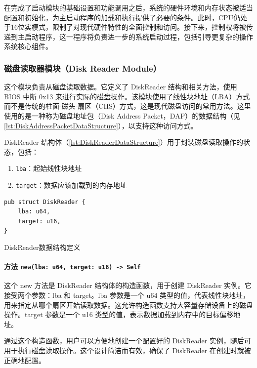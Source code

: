 在完成了启动模块的基础设置和功能调用之后，系统的硬件环境和内存状态被适当配置和初始化，为主启动程序的加载和执行提供了必要的条件。此时，CPU仍处于16位实模式，限制了对现代硬件特性的全面控制和访问。接下来，控制权将被传递到主启动程序，这一程序将负责进一步的系统启动过程，包括引导更复杂的操作系统核心组件。

\subsubsection{磁盘读取器模块（Disk Reader Module）}

这个模块负责从磁盘读取数据。它定义了 DiskReader 结构和相关方法，使用 BIOS 中断 0x13 来进行实际的磁盘操作。该模块使用了线性块地址（LBA）方式而不是传统的柱面-磁头-扇区（CHS）方式，这是现代磁盘访问的常用方法。这里使用的是一种称为磁盘地址包（Disk Address Packet，DAP）的数据结构（见\cref{lst:DiskAddressPacketDataStructure}），以支持这种访问方式。

DiskReader 结构体（\cref{lst:DiskReaderDataStructure}）用于封装磁盘读取操作的状态，包括：

\begin{enumerate}
    \item \texttt{lba}：起始线性块地址
    \item \texttt{target}：数据应该加载到的内存地址
\end{enumerate}

\begin{listing}[htbp]
    \begin{verbatim}
pub struct DiskReader {
    lba: u64,
    target: u16,
}
    \end{verbatim}
    \caption{DiskReader数据结构定义}\label{lst:DiskReaderDataStructure}
\end{listing}

\paragraph{方法 \texttt{new(lba: u64, target: u16) -> Self}}

这个 new 方法是 DiskReader 结构体的构造函数，用于创建 DiskReader 实例。它接受两个参数：lba 和 target。lba 参数是一个 u64 类型的值，代表线性块地址，用来指定从哪个扇区开始读取数据。这允许构造函数支持大容量存储设备上的磁盘操作。target 参数是一个 u16 类型的值，表示数据加载到内存中的目标偏移地址。

通过这个构造函数，用户可以方便地创建一个配置好的 DiskReader 实例，随后可用于执行磁盘读取操作。这个设计简洁而有效，确保了 DiskReader 在创建时就被正确地配置。

